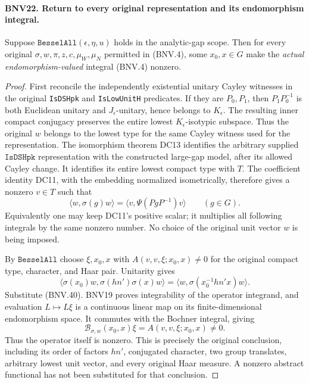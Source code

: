 \paragraph{BNV22. Return to every original representation and its endomorphism integral.}
\label{claim:BNV22}
Suppose $\texttt{BesselAll}(\epsilon,\eta,u)$ holds in the analytic-gap
scope.  Then for every original $\sigma,w,\pi,z,c,\mu_W,\mu_N$ permitted
in (BNV.4), some $x_0,x\in G$ make the \emph{actual endomorphism-valued}
integral (BNV.4) nonzero.

\begin{proof}
First reconcile the independently existential unitary Cayley witnesses
in the original \texttt{IsDSHpk} and \texttt{IsLowUnitH} predicates.
If they are $P_0,P_1$, then $P_1P_0^{-1}$ is both Euclidean unitary
and $J_\epsilon$-unitary, hence belongs to $K_\epsilon$.
The resulting inner compact conjugacy preserves the entire lowest
$K_\epsilon$-isotypic subspace.  Thus the original $w$ belongs to the
lowest type for the same Cayley witness used for the representation.
The isomorphism theorem DC13 identifies the arbitrary supplied
$\texttt{IsDSHpk}$ representation with the constructed large-gap model,
after its allowed Cayley change.  It identifies its entire lowest
compact type with $T$.  The coefficient identity DC11, with the
embedding normalized isometrically, therefore gives a nonzero $v\in T$
such that
\[
 \langle w,\sigma(g)w\rangle
       =\langle v,\Psi(PgP^{-1})v\rangle\qquad(g\in G).
 \tag{BNV.40}
\]
Equivalently one may keep DC11's positive scalar; it multiplies all
following integrals by the same nonzero number.  No choice of the
original unit vector $w$ is being imposed.

By $\texttt{BesselAll}$ choose $\xi,x_0,x$ with
$A(v,v,\xi;x_0,x)\ne0$ for the original compact type, character, and
Haar pair.  Unitarity gives
\[
 \langle\sigma(x_0)w,\sigma(hn')\sigma(x)w\rangle
 =\langle w,\sigma(x_0^{-1}hn'x)w\rangle.
\]
Substitute (BNV.40).  BNV19 proves integrability of the operator
integrand, and evaluation $L\mapsto L\xi$ is a continuous linear map
on its finite-dimensional endomorphism space.  It commutes with the
Bochner integral, giving
\[
 \mathcal B_{\sigma,w}(x_0,x)\xi=A(v,v,\xi;x_0,x)\ne0.
\]
Thus the operator itself is nonzero.  This is precisely the original
conclusion, including its order of factors $hn'$, conjugated character,
two group translates, arbitrary lowest unit vector, and every original
Haar measure.  A nonzero abstract functional has not been substituted
for that conclusion.
\end{proof}

